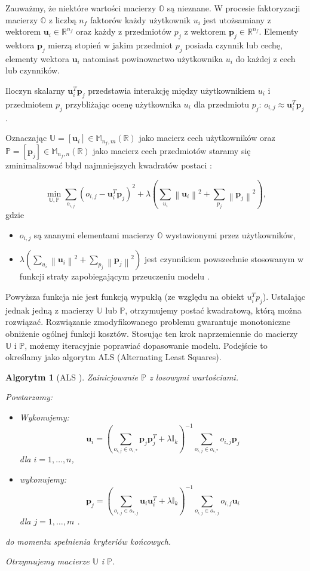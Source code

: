 \documentclass[12pt,a4paper]{report}
\newtheorem{algorytm}[df]{Algorytm}
\newcommand{\setR}{\mathbb{R}}
\newcommand{\norm}[2][]{\left\| {#2} \right\|_{#1}}
\begin{document}
Zauważmy, że niektóre wartości macierzy $\mathbb{O}$ są nieznane. W procesie faktoryzacji macierzy $\mathbb{O}$ z liczbą $n_f$ faktorów każdy użytkownik $u_i$ jest utożsamiany z wektorem $\mathbf{u}_i \in \setR^{n_f}$ oraz każdy z przedmiotów $p_j$ z wektorem $\mathbf{p}_j \in \setR^{n_f}$. Elementy wektora $\mathbf{p}_j$ mierzą stopień w jakim przedmiot $p_j$ posiada czynnik lub cechę, elementy wektora $\mathbf{u}_i$ natomiast powinowactwo użytkownika $u_i$ do każdej z cech lub czynników.

Iloczyn skalarny $\mathbf{u}_i^T \mathbf{p}_j$ przedstawia interakcję między użytkownikiem $u_i$ i przedmiotem $p_j$ przybliżając ocenę użytkownika $u_i$ dla przedmiotu $p_j$: $o_{i,j} \approx \mathbf{u}_i^T \mathbf{p}_j$. 

Oznaczając $\mathbb{U}=[\mathbf{u}_i] \in \mathbb{M}_{n_f,m}(\setR)$ jako macierz cech użytkowników oraz $\mathbb{P}=[\mathbf{p}_j] \in \mathbb{M}_{n_f,n}(\setR)$ jako macierz cech przedmiotów staramy się zminimalizować błąd najmniejszych kwadratów postaci {\citep{mcvals}}:

$$
\min_{\mathbb{U}, \mathbb{P}} \sum_{o_{i,j}} (o_{i,j} - \mathbf{u}_i^T \mathbf{p}_j)^2 + \lambda (\sum_{u_i} \norm{\mathbf{u}_i}^2 + \sum_{p_j} \norm{\mathbf{p}_j}^2),
$$
gdzie 
\begin{itemize}
\item $o_{i,j}$ są znanymi elementami macierzy $\mathbb{O}$ wystawionymi przez użytkowników,
\item $\lambda (\sum_{u_i} \norm{\mathbf{u}_i}^2 + \sum_{p_j} \norm{\mathbf{p}_j}^2)$ jest czynnikiem powszechnie stosowanym w funkcji straty zapobiegającym przeuczeniu modelu .
\end{itemize}

Powyższa funkcja nie jest funkcją wypukłą (ze względu na obiekt $u_i^Tp_j$). Ustalając jednak jedną z macierzy $\mathbb{U}$ lub $\mathbb{P}$, otrzymujemy postać kwadratową, którą można rozwiązać. Rozwiązanie zmodyfikowanego problemu gwarantuje monotoniczne obniżenie ogólnej funkcji kosztów. Stosując ten krok naprzemiennie do macierzy $\mathbb{U}$ i $\mathbb{P}$, możemy iteracyjnie poprawiać dopasowanie modelu. Podejście to określamy jako algorytm ALS (Alternating Least Squares).

\begin{algorytm}[ALS {\citep{mcvals}}]
Zainicjowanie $\mathbb{P}$ z losowymi wartościami.

Powtarzamy:
\begin{itemize}
\item Wykonujemy:
$$
\mathbf{u}_i = (\sum_{o_{i,j} \in o_{i,*}} \mathbf{p}_j \mathbf{p}_j^T + \lambda \mathbb{I}_k)^{-1} \sum_{o_{i,j} \in o_{i,*}} o_{i,j}\mathbf{p}_j
$$
dla $i = 1, \ldots, n $,
\item wykonujemy:
$$
\mathbf{p}_j = (\sum_{o_{i,j} \in o_{*,j}} \mathbf{u}_i \mathbf{u}_i^T + \lambda \mathbb{I}_k)^{-1} \sum_{o_{i,j} \in o_{*,j}} o_{i,j}\mathbf{u}_i
$$
dla $j = 1, \ldots, m$ .
\end{itemize}
do momentu spełnienia kryteriów końcowych.

Otrzymujemy macierze $\mathbb{U}$ i $\mathbb{P}$.
\end{algorytm}
\end{document}
